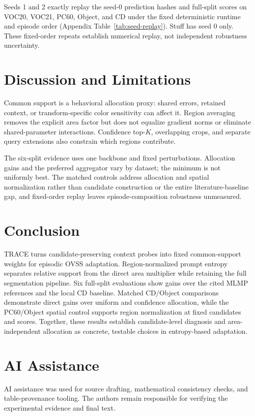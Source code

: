 \documentclass[letterpaper]{article}
\begin{document}
Seeds 1 and 2 exactly replay the seed-0 prediction hashes and full-split scores on VOC20, VOC21, PC60, Object, and CD under the fixed deterministic runtime and episode order (Appendix Table~\ref{tab:seed-replay}). Stuff has seed 0 only. These fixed-order repeats establish numerical replay, not independent robustness uncertainty.

\clearpage
\section{Discussion and Limitations}
Common support is a behavioral allocation proxy: shared errors, retained context, or transform-specific color sensitivity can affect it. Region averaging removes the explicit area factor but does not equalize gradient norms or eliminate shared-parameter interactions. Confidence top-$K$, overlapping crops, and separate query extensions also constrain which regions contribute.

The six-split evidence uses one backbone and fixed perturbations. Allocation gains and the preferred aggregator vary by dataset; the minimum is not uniformly best. The matched controls address allocation and spatial normalization rather than candidate construction or the entire literature-baseline gap, and fixed-order replay leaves episode-composition robustness unmeasured.

\section{Conclusion}
TRACE turns candidate-preserving context probes into fixed common-support weights for episodic OVSS adaptation. Region-normalized prompt entropy separates relative support from the direct area multiplier while retaining the full segmentation pipeline. Six full-split evaluations show gains over the cited MLMP references and the local CD baseline. Matched CD/Object comparisons demonstrate direct gains over uniform and confidence allocation, while the PC60/Object spatial control supports region normalization at fixed candidates and scores. Together, these results establish candidate-level diagnosis and area-independent allocation as concrete, testable choices in entropy-based adaptation.

\section*{AI Assistance}
AI assistance was used for source drafting, mathematical consistency checks, and table-provenance tooling. The authors remain responsible for verifying the experimental evidence and final text.


\clearpage
\appendix

\end{document}
